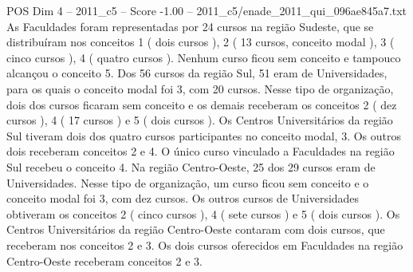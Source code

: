 \begin{textsample}{POS Dim 4 – 2011\_c5 – Score -1.00 – 2011\_c5/enade\_2011\_qui\_096ae845a7.txt}
As Faculdades foram representadas por 24 cursos na região Sudeste, que se distribuíram nos conceitos 1 ( dois cursos ), 2 ( 13 cursos, conceito modal ), 3 ( cinco cursos ), 4 ( quatro cursos ).
Nenhum curso ficou sem conceito e tampouco alcançou o conceito 5.
Dos 56 cursos da região Sul, 51 eram de Universidades, para os quais o conceito modal foi 3, com 20 cursos.
Nesse tipo de organização, dois dos cursos ficaram sem conceito e os demais receberam os conceitos 2 ( dez cursos ), 4 ( 17 cursos ) e 5 ( dois cursos ).
Os Centros Universitários da região Sul tiveram dois dos quatro cursos participantes no conceito modal, 3.
Os outros dois receberam conceitos 2 e 4.
O único curso vinculado a Faculdades na região Sul recebeu o conceito 4.
Na região Centro-Oeste, 25 dos 29 cursos eram de Universidades.
Nesse tipo de organização, um curso ficou sem conceito e o conceito modal foi 3, com dez cursos.
Os outros cursos de Universidades obtiveram os conceitos 2 ( cinco cursos ), 4 ( sete cursos ) e 5 ( dois cursos ).
Os Centros Universitários da região Centro-Oeste contaram com dois cursos, que receberam nos conceitos 2 e 3.
Os dois cursos oferecidos em Faculdades na região Centro-Oeste receberam conceitos 2 e 3.

\end{textsample}
